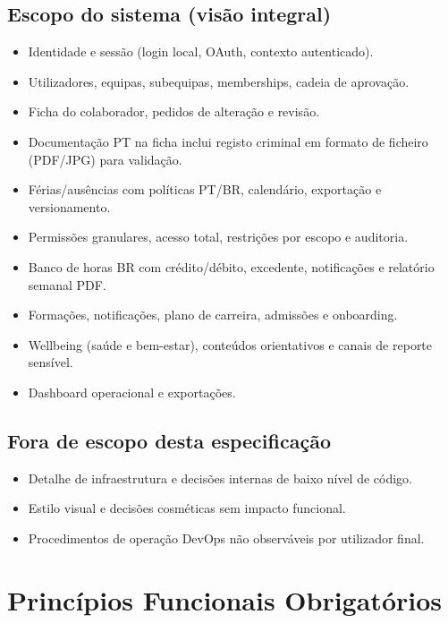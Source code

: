 \documentclass[11pt,a4paper,twoside]{article}
\begin{document}
\subsection{Escopo do sistema (visão integral)}
\begin{itemize}
  \item Identidade e sessão (login local, OAuth, contexto autenticado).
  \item Utilizadores, equipas, subequipas, memberships, cadeia de aprovação.
  \item Ficha do colaborador, pedidos de alteração e revisão.
  \item Documentação PT na ficha inclui registo criminal em formato de ficheiro (PDF/JPG) para validação.
  \item Férias/ausências com políticas PT/BR, calendário, exportação e versionamento.
  \item Permissões granulares, acesso total, restrições por escopo e auditoria.
  \item Banco de horas BR com crédito/débito, excedente, notificações e relatório semanal PDF.
  \item Formações, notificações, plano de carreira, admissões e onboarding.
  \item Wellbeing (saúde e bem-estar), conteúdos orientativos e canais de reporte sensível.
  \item Dashboard operacional e exportações.
\end{itemize}

\subsection{Fora de escopo desta especificação}
\begin{itemize}
  \item Detalhe de infraestrutura e decisões internas de baixo nível de código.
  \item Estilo visual e decisões cosméticas sem impacto funcional.
  \item Procedimentos de operação DevOps não observáveis por utilizador final.
\end{itemize}

\section{Princípios Funcionais Obrigatórios}
\end{document}
